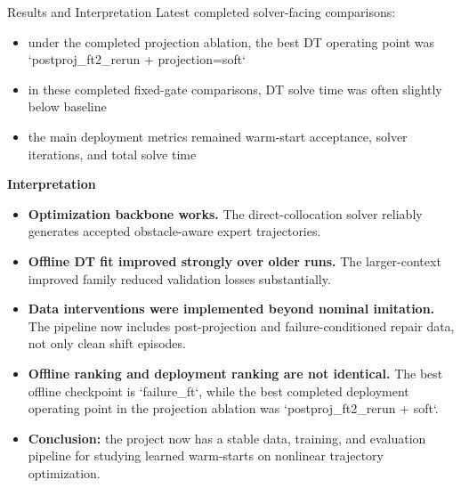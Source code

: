\documentclass[final]{beamer}
\newlength{\colwidth}
\begin{document}
\begin{frame}[t]
\begin{columns}[t]
\begin{column}{\colwidth}
\begin{block}{Results and Interpretation}
Latest completed solver-facing comparisons:
\begin{itemize}
  \item under the completed projection ablation, the best DT operating point was `postproj\_ft2\_rerun + projection=soft`
  \item in these completed fixed-gate comparisons, DT solve time was often slightly below baseline
  \item the main deployment metrics remained warm-start acceptance, solver iterations, and total solve time
\end{itemize}

\textbf{Interpretation}
\begin{itemize}
  \item \textbf{Optimization backbone works.} The direct-collocation solver reliably generates accepted obstacle-aware expert trajectories.
  \item \textbf{Offline DT fit improved strongly over older runs.} The larger-context improved family reduced validation losses substantially.
  \item \textbf{Data interventions were implemented beyond nominal imitation.} The pipeline now includes post-projection and failure-conditioned repair data, not only clean shift episodes.
  \item \textbf{Offline ranking and deployment ranking are not identical.} The best offline checkpoint is `failure\_ft`, while the best completed deployment operating point in the projection ablation was `postproj\_ft2\_rerun + soft`.
  \item \textbf{Conclusion:} the project now has a stable data, training, and evaluation pipeline for studying learned warm-starts on nonlinear trajectory optimization.
\end{itemize}
\end{block}


\end{column}
\end{columns}
\end{frame}
\end{document}
